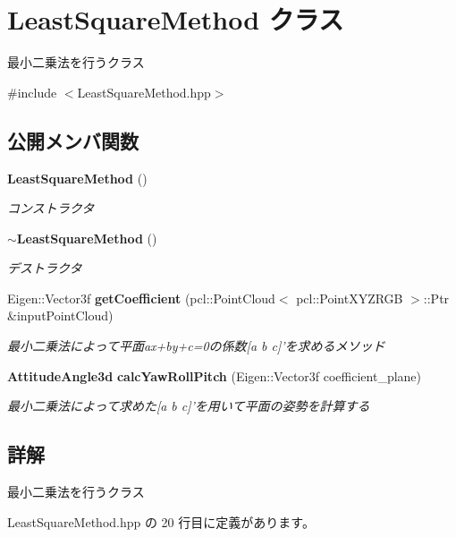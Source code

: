 \section{Least\-Square\-Method クラス}
\label{class_least_square_method}


最小二乗法を行うクラス  




{\ttfamily \#include $<$Least\-Square\-Method.\-hpp$>$}

\subsection*{公開メンバ関数}
\begin{DoxyCompactItemize}
\item 
{\bf Least\-Square\-Method} ()
\begin{DoxyCompactList}\small\item\em コンストラクタ \end{DoxyCompactList}\item 
{\bf $\sim$\-Least\-Square\-Method} ()
\begin{DoxyCompactList}\small\item\em デストラクタ \end{DoxyCompactList}\item 
Eigen\-::\-Vector3f {\bf get\-Coefficient} (pcl\-::\-Point\-Cloud$<$ pcl\-::\-Point\-X\-Y\-Z\-R\-G\-B $>$\-::Ptr \&input\-Point\-Cloud)
\begin{DoxyCompactList}\small\item\em 最小二乗法によって平面ax+by+c=0の係数[a b c]'を求めるメソッド \end{DoxyCompactList}\item 
{\bf Attitude\-Angle3d} {\bf calc\-Yaw\-Roll\-Pitch} (Eigen\-::\-Vector3f coefficient\-\_\-plane)
\begin{DoxyCompactList}\small\item\em 最小二乗法によって求めた[a b c]'を用いて平面の姿勢を計算する \end{DoxyCompactList}\end{DoxyCompactItemize}


\subsection{詳解}
最小二乗法を行うクラス 

 Least\-Square\-Method.\-hpp の 20 行目に定義があります。



